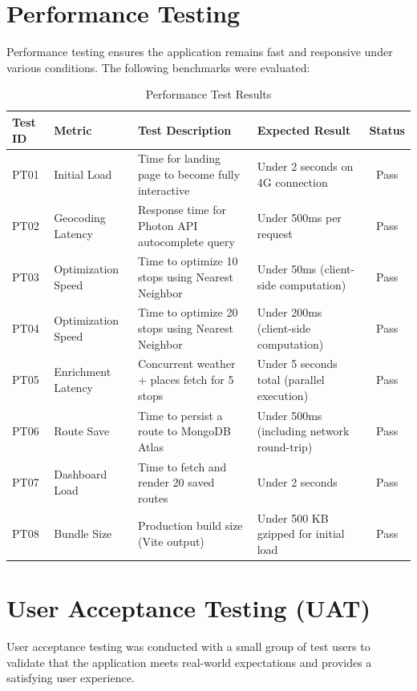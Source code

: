 \section{Performance Testing}
Performance testing ensures the application remains fast and responsive under various conditions. The following benchmarks were evaluated:

\begin{table}[H]
    \centering
    \renewcommand{\arraystretch}{1.3}
    \begin{tabular}{|p{1.2cm}|p{2.5cm}|p{4cm}|p{3cm}|c|}
        \hline
        \textbf{Test ID} & \textbf{Metric} & \textbf{Test Description} & \textbf{Expected Result} & \textbf{Status} \\
        \hline
        PT01 & Initial Load & Time for landing page to become fully interactive & Under 2 seconds on 4G connection & Pass \\
        \hline
        PT02 & Geocoding Latency & Response time for Photon API autocomplete query & Under 500ms per request & Pass \\
        \hline
        PT03 & Optimization Speed & Time to optimize 10 stops using Nearest Neighbor & Under 50ms (client-side computation) & Pass \\
        \hline
        PT04 & Optimization Speed & Time to optimize 20 stops using Nearest Neighbor & Under 200ms (client-side computation) & Pass \\
        \hline
        PT05 & Enrichment Latency & Concurrent weather + places fetch for 5 stops & Under 5 seconds total (parallel execution) & Pass \\
        \hline
        PT06 & Route Save & Time to persist a route to MongoDB Atlas & Under 500ms (including network round-trip) & Pass \\
        \hline
        PT07 & Dashboard Load & Time to fetch and render 20 saved routes & Under 2 seconds & Pass \\
        \hline
        PT08 & Bundle Size & Production build size (Vite output) & Under 500 KB gzipped for initial load & Pass \\
        \hline
    \end{tabular}
    \caption{Performance Test Results}
    \label{tab:perf_tests}
\end{table}

\section{User Acceptance Testing (UAT)}
User acceptance testing was conducted with a small group of test users to validate that the application meets real-world expectations and provides a satisfying user experience.

